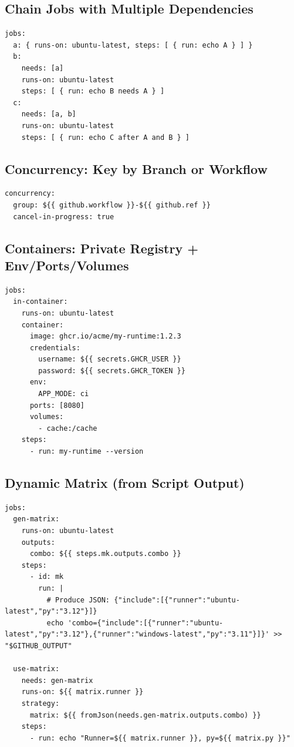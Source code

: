 \documentclass[11pt]{article}
\begin{document}
\subsection*{Chain Jobs with Multiple Dependencies}
\begin{verbatim}
jobs:
  a: { runs-on: ubuntu-latest, steps: [ { run: echo A } ] }
  b:
    needs: [a]
    runs-on: ubuntu-latest
    steps: [ { run: echo B needs A } ]
  c:
    needs: [a, b]
    runs-on: ubuntu-latest
    steps: [ { run: echo C after A and B } ]
\end{verbatim}

\subsection*{Concurrency: Key by Branch or Workflow}
\begin{verbatim}
concurrency:
  group: ${{ github.workflow }}-${{ github.ref }}
  cancel-in-progress: true
\end{verbatim}

\subsection*{Containers: Private Registry + Env/Ports/Volumes}
\begin{verbatim}
jobs:
  in-container:
    runs-on: ubuntu-latest
    container:
      image: ghcr.io/acme/my-runtime:1.2.3
      credentials:
        username: ${{ secrets.GHCR_USER }}
        password: ${{ secrets.GHCR_TOKEN }}
      env:
        APP_MODE: ci
      ports: [8080]
      volumes:
        - cache:/cache
    steps:
      - run: my-runtime --version
\end{verbatim}

\subsection*{Dynamic Matrix (from Script Output)}
\begin{verbatim}
jobs:
  gen-matrix:
    runs-on: ubuntu-latest
    outputs:
      combo: ${{ steps.mk.outputs.combo }}
    steps:
      - id: mk
        run: |
          # Produce JSON: {"include":[{"runner":"ubuntu-latest","py":"3.12"}]}
          echo 'combo={"include":[{"runner":"ubuntu-latest","py":"3.12"},{"runner":"windows-latest","py":"3.11"}]}' >> "$GITHUB_OUTPUT"

  use-matrix:
    needs: gen-matrix
    runs-on: ${{ matrix.runner }}
    strategy:
      matrix: ${{ fromJson(needs.gen-matrix.outputs.combo) }}
    steps:
      - run: echo "Runner=${{ matrix.runner }}, py=${{ matrix.py }}"
\end{verbatim}
\end{document}
